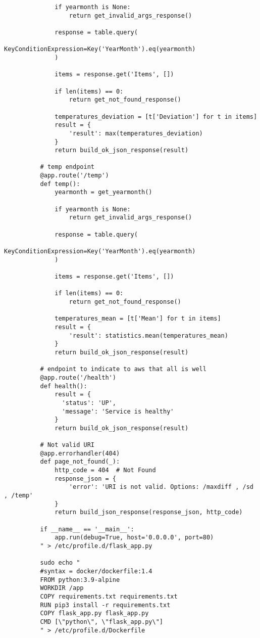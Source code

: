 \begin{verbatim}
              if yearmonth is None:
                  return get_invalid_args_response()

              response = table.query(
                  KeyConditionExpression=Key('YearMonth').eq(yearmonth)
              )

              items = response.get('Items', [])

              if len(items) == 0:
                  return get_not_found_response()
              
              temperatures_deviation = [t['Deviation'] for t in items]
              result = {
                  'result': max(temperatures_deviation)
              }
              return build_ok_json_response(result)

          # temp endpoint
          @app.route('/temp')
          def temp():
              yearmonth = get_yearmonth()

              if yearmonth is None:
                  return get_invalid_args_response()

              response = table.query(
                  KeyConditionExpression=Key('YearMonth').eq(yearmonth)
              )

              items = response.get('Items', [])

              if len(items) == 0:
                  return get_not_found_response()

              temperatures_mean = [t['Mean'] for t in items]
              result = {
                  'result': statistics.mean(temperatures_mean)
              }
              return build_ok_json_response(result)

          # endpoint to indicate to aws that all is well
          @app.route('/health')
          def health():
              result = {
                'status': 'UP',
                'message': 'Service is healthy'
              }
              return build_ok_json_response(result)

          # Not valid URI
          @app.errorhandler(404)
          def page_not_found(_):
              http_code = 404  # Not Found
              response_json = {
                  'error': 'URI is not valid. Options: /maxdiff , /sd , /temp'
              }
              return build_json_response(response_json, http_code)

          if __name__ == '__main__':
              app.run(debug=True, host='0.0.0.0', port=80)
          " > /etc/profile.d/flask_app.py

          sudo echo "
          #syntax = docker/dockerfile:1.4
          FROM python:3.9-alpine
          WORKDIR /app
          COPY requirements.txt requirements.txt
          RUN pip3 install -r requirements.txt
          COPY flask_app.py flask_app.py
          CMD [\"python\", \"flask_app.py\"]
          " > /etc/profile.d/Dockerfile


\end{verbatim}
